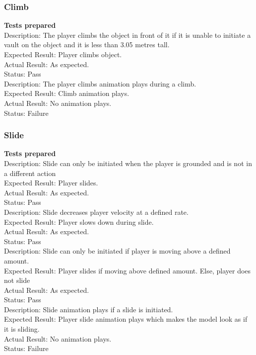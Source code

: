 \documentclass[11pt,a4paper]{article}
\begin{document}
\subsubsection{Climb}
\textbf{Tests prepared}\\
Description: The player climbs the object in front of it if it is unable to initiate a vault on the object and it is less than 3.05 metres tall. \\
Expected Result: Player climbs object.\\
Actual Result: As expected.\\
Status: Pass
\smallskip\\
Description: The player climbs animation plays during a climb. \\
Expected Result: Climb animation plays.\\
Actual Result:  No animation plays.\\
Status: Failure
\subsubsection{Slide}
\textbf{Tests prepared}\\
Description: Slide can only be initiated when the player is grounded and is not in a different action\\
Expected Result: Player slides.\\
Actual Result: As expected.\\
Status: Pass
\smallskip\\
Description: Slide decreases player velocity at a defined rate. \\
Expected Result: Player slows down during slide.\\
Actual Result: As expected.\\
Status: Pass
\smallskip\\
Description: Slide can only be initiated if player is moving above a defined amount. \\
Expected Result: Player slides if moving above defined amount. Else, player does not slide\\
Actual Result: As expected.\\
Status: Pass
\smallskip\\
Description: Slide animation plays if a slide is initiated. \\
Expected Result: Player slide animation plays which makes the model look as if it is sliding.\\
Actual Result: No animation plays.\\
Status: Failure
\end{document}
